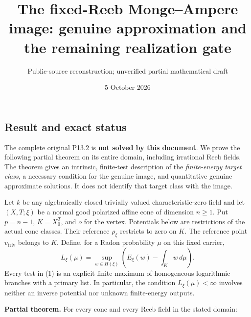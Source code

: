\documentclass[
  10pt,
]{article}
\title{The fixed-Reeb Monge--Ampere image: genuine approximation and the
remaining realization gate}
\author{Public-source reconstruction; unverified partial mathematical
draft}
\date{5 October 2026}
\begin{document}
\maketitle

\subsection{Result and exact status}\label{result-and-exact-status}

The complete original P13.2 is \textbf{not solved by this document}. We
prove the following partial theorem on its entire domain, including
irrational Reeb fields. The theorem gives an intrinsic, finite-test
description of the \emph{finite-energy target class}, a necessary
condition for the genuine image, and quantitative genuine approximate
solutions. It does not identify that target class with the image.

Let \(k\) be any algebraically closed trivially valued
characteristic-zero field and let \((X,T;\xi)\) be a normal good
polarized affine cone of dimension \(n\geq1\). Put \(p=n-1\),
\(K=X_0^T\), and \(o\) for the vertex. Potentials below are restrictions
of the actual cone classes. Their reference \(\rho_\xi\) restricts to
zero on \(K\). The reference point \(v_{\mathrm{triv}}\) belongs to
\(K\). Define, for a Radon probability \(\mu\) on this fixed carrier, \[
 L_\xi(\mu)=\sup_{w\in H(\xi)}\left(E_\xi(w)-\int_Kw\,d\mu\right).                     \tag{1}
\] Every test in (1) is an explicit finite maximum of homogeneous
logarithmic branches with a primary list. In particular, the condition
\(L_\xi(\mu)<\infty\) involves neither an inverse potential nor unknown
finite-energy outputs.

\textbf{Partial theorem.} For every cone and every Reeb field in the
stated domain:
\end{document}
